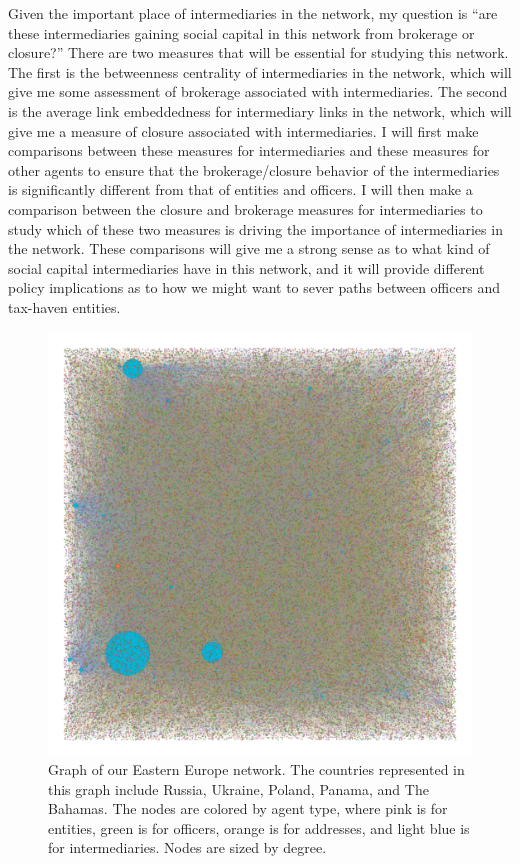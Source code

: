 \documentclass[11pt]{article}
\begin{document}
Given the important place of intermediaries in the network, my question is
``are these intermediaries gaining social capital in this
network from brokerage or closure?'' There are two measures that will be
essential for studying this network. The first is the betweenness centrality
of intermediaries in the network, which will give me some assessment of
brokerage associated with intermediaries. The second is the average link
embeddedness for intermediary links in the network, which will give me a measure
of closure associated with intermediaries. I will first
make comparisons between these
measures for intermediaries and these measures for other agents to ensure that
the brokerage/closure behavior of the intermediaries is significantly
different from that of entities and officers. I will then make a comparison
between the closure and brokerage measures for intermediaries to study
which of these two measures is driving the importance of intermediaries in
the network. These comparisons will give me a
strong sense as to what kind of social capital intermediaries have in this
network, and it will provide different policy implications as to how we might
want to sever paths between officers and tax-haven entities.

\begin{figure}[h!]
    \centering
    \includegraphics[width = 5in]{../analysis/figures/easternEuropeNetwork.png}
    \caption{Graph of our Eastern Europe network. The countries represented
        in this graph include Russia, Ukraine, Poland, Panama, and The Bahamas.
        The nodes are colored by
        agent type, where pink is for entities, green is for officers,
        orange is for addresses, and light blue is for intermediaries. Nodes
        are sized by degree.}
\end{figure}
\end{document}

